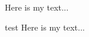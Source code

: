 \documentclass{beamer}
\begin{document}
\begin{frame}
  \begin{block}{}
    Here is my text...
  \end{block}

  \begin{block}{test}
    Here is my text...
  \end{block}
\end{frame}
\end{document}
